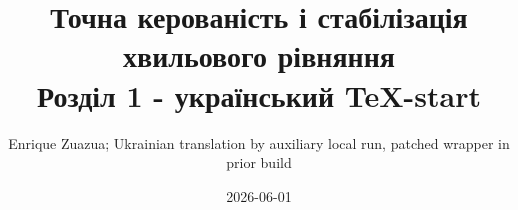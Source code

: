 \documentclass[11pt,a4paper,oneside]{book}
\begin{document}
\frontmatter
\title{Точна керованість і стабілізація хвильового рівняння\\\large Розділ 1 - український TeX-start}
\author{Enrique Zuazua; Ukrainian translation by auxiliary local run, patched wrapper in prior build}
\date{2026-06-01}
\maketitle
\tableofcontents
\mainmatter

\end{document}
